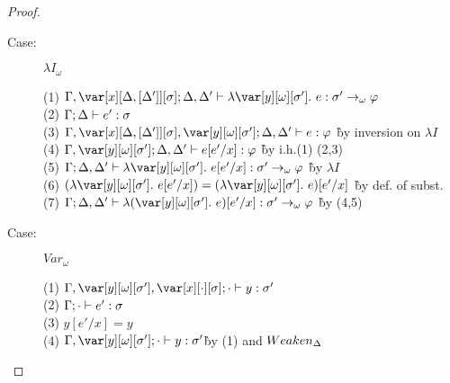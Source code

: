 \begin{proof}
\begin{description}
\item[Case:] $\lambda I_\omega$
\begin{tabbing}
    (1) $\G, \xD; \D, \D' \vdash \lambda \y[\omega][\s'].~e : \s' \to_\omega \vp$\\
    (2) $\Gamma; \Delta \vdash e' : \sigma$\\
    (3) $\G, \xD, \y[\omega][\s']; \D, \D' \vdash e : \vp$ \` by inversion on $\lambda I$\\
    (4) $\G, \y[\omega][\s']; \D, \D' \vdash e[e'/x] : \vp$ \` by i.h.(1) (2,3)\\
    (5) $\G; \D, \D' \vdash \lambda \y[\omega][\s'].~e[e'/x] : \s' \to_\omega \vp$ \` by $\lambda I$\\
    (6) $(\lambda \y[\omega][\s'].~e[e'/x]) = (\lambda \y[\omega][\s'].~e)[e'/x]$ \` by def. of subst.\\
    (7) $\G; \D, \D' \vdash \lambda (\y[\omega][\s'].~e)[e'/x] : \s' \to_\omega \vp$ \` by (4,5)\\
\end{tabbing}

%
%
\item[Case:] $Var_\omega$
\begin{tabbing}
    (1) $\G, \yo, \x[\cdot][\s]; \cdot \vdash y : \s'$\\
    (2) $\Gamma; \cdot \vdash e' : \sigma$\\
    (3) $y[e'/x] = y$\\
    (4) $\G,\yo;\cdot \vdash y : \s'$\` by (1) and $Weaken_\Delta$\\
\end{tabbing}


\end{description}
\end{proof}
